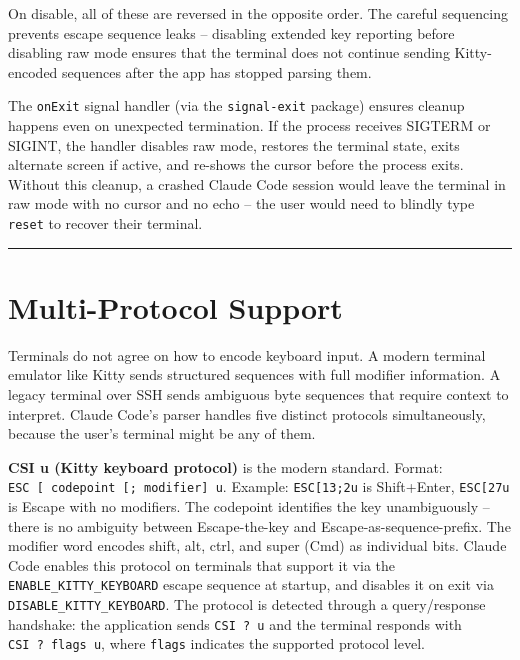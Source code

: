 \documentclass[
  english,
  11pt,
  letterpaper,
]{book}
\begin{document}
On disable, all of these are reversed in the opposite order. The careful
sequencing prevents escape sequence leaks -- disabling extended key
reporting before disabling raw mode ensures that the terminal does not
continue sending Kitty-encoded sequences after the app has stopped
parsing them.

The \texttt{onExit} signal handler (via the \texttt{signal-exit}
package) ensures cleanup happens even on unexpected termination. If the
process receives SIGTERM or SIGINT, the handler disables raw mode,
restores the terminal state, exits alternate screen if active, and
re-shows the cursor before the process exits. Without this cleanup, a
crashed Claude Code session would leave the terminal in raw mode with no
cursor and no echo -- the user would need to blindly type \texttt{reset}
to recover their terminal.

\begin{center}\rule{0.5\linewidth}{0.5pt}\end{center}

\section{Multi-Protocol Support}\label{multi-protocol-support}

Terminals do not agree on how to encode keyboard input. A modern
terminal emulator like Kitty sends structured sequences with full
modifier information. A legacy terminal over SSH sends ambiguous byte
sequences that require context to interpret. Claude Code's parser
handles five distinct protocols simultaneously, because the user's
terminal might be any of them.

\textbf{CSI u (Kitty keyboard protocol)} is the modern standard. Format:
\texttt{ESC\ {[}\ codepoint\ {[};\ modifier{]}\ u}. Example:
\texttt{ESC{[}13;2u} is Shift+Enter, \texttt{ESC{[}27u} is Escape with
no modifiers. The codepoint identifies the key unambiguously -- there is
no ambiguity between Escape-the-key and Escape-as-sequence-prefix. The
modifier word encodes shift, alt, ctrl, and super (Cmd) as individual
bits. Claude Code enables this protocol on terminals that support it via
the \texttt{ENABLE\_KITTY\_KEYBOARD} escape sequence at startup, and
disables it on exit via \texttt{DISABLE\_KITTY\_KEYBOARD}. The protocol
is detected through a query/response handshake: the application sends
\texttt{CSI\ ?\ u} and the terminal responds with
\texttt{CSI\ ?\ flags\ u}, where \texttt{flags} indicates the supported
protocol level.
\end{document}
